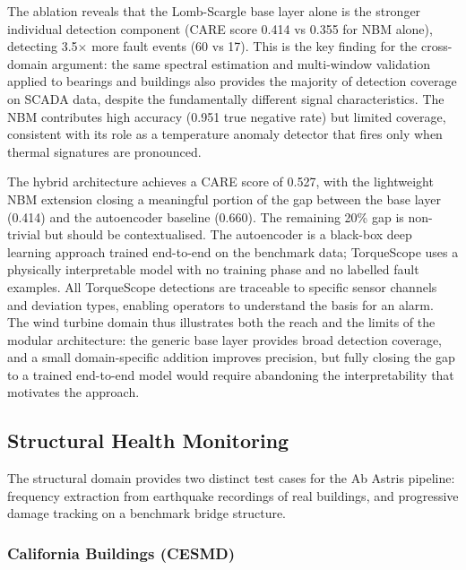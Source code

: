 \documentclass[11pt,a4paper]{article}
\begin{document}
The ablation reveals that the Lomb-Scargle base layer alone is the stronger individual detection component (CARE score 0.414 vs 0.355 for NBM alone), detecting 3.5$\times$ more fault events (60 vs 17). This is the key finding for the cross-domain argument: the same spectral estimation and multi-window validation applied to bearings and buildings also provides the majority of detection coverage on SCADA data, despite the fundamentally different signal characteristics. The NBM contributes high accuracy (0.951 true negative rate) but limited coverage, consistent with its role as a temperature anomaly detector that fires only when thermal signatures are pronounced.

The hybrid architecture achieves a CARE score of 0.527, with the lightweight NBM extension closing a meaningful portion of the gap between the base layer (0.414) and the autoencoder baseline (0.660). The remaining 20\% gap is non-trivial but should be contextualised. The autoencoder is a black-box deep learning approach trained end-to-end on the benchmark data; TorqueScope uses a physically interpretable model with no training phase and no labelled fault examples. All TorqueScope detections are traceable to specific sensor channels and deviation types, enabling operators to understand the basis for an alarm. The wind turbine domain thus illustrates both the reach and the limits of the modular architecture: the generic base layer provides broad detection coverage, and a small domain-specific addition improves precision, but fully closing the gap to a trained end-to-end model would require abandoning the interpretability that motivates the approach.

\subsection{Structural Health Monitoring}
\label{sec:shm}

The structural domain provides two distinct test cases for the Ab Astris pipeline: frequency extraction from earthquake recordings of real buildings, and progressive damage tracking on a benchmark bridge structure.

\subsubsection{California Buildings (CESMD)}
\label{sec:cesmd}
\end{document}
